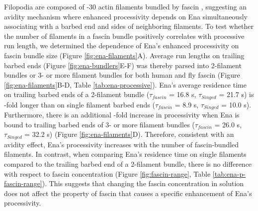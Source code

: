 Filopodia are composed of -30 actin filaments bundled by fascin \citep{svitkina_mechanism_2003,faix_making_2006}, suggesting an avidity mechanism where enhanced processivity depends on Ena simultaneously associating with a barbed end and sides of neighboring filaments. To test whether the number of filaments in a fascin bundle positively correlates with processive run length, we determined the dependence of Ena's enhanced processivity on fascin bundle size (Figure \ref{fig:ena-filaments}A). Average run lengths on trailing barbed ends (Figure \ref{fig:ena-bundlers}E-F) was thereby parsed into 2-filament bundles or 3- or more filament bundles for both human and fly fascin (Figure \ref{fig:ena-filaments}B-D, Table \ref{tab:ena-processive}). Ena's average residence time on trailing barbed ends of a 2-filament bundle ($\tau_{fascin}$ = 16.8 s, $\tau_{Singed}$ = 21.7 s) is -fold longer than on single filament barbed ends ($\tau_{fascin}$ = 8.9 s, $\tau_{Singed}$ = 10.0 s). Furthermore, there is an additional -fold increase in processivity when Ena is bound to trailing barbed ends of 3- or more filament bundles ($\tau_{fascin}$ = 26.0 s, $\tau_{Singed}$ = 32.2 s) (Figure \ref{fig:ena-filaments}D). Therefore, consistent with an avidity effect, Ena's processivity increases with the number of fascin-bundled filaments. In contrast, when comparing Ena's residence time on single filaments compared to the trailing barbed end of a 2-filament bundle, there is no difference with respect to fascin concentration (Figure \ref{fig:fascin-range}, Table \ref{tab:ena-p-fascin-range}). This suggests that changing the fascin concentration in solution does not affect the property of fascin that causes a specific enhancement of Ena's processivity. 

